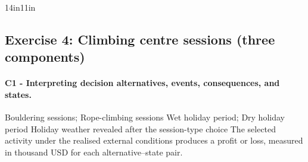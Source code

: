 \begin{CalculationLandscape}{14in}{11in}
	\begingroup\renewcommand{\CalculationStateCount}{2}
\endgroup
\end{CalculationLandscape}


	\newpage
	\subsection{Exercise 4: Climbing centre sessions (three components)}
	\label{sec:problem4-climbing-centre-c1-c3}
	\paragraph*{C1 - Interpreting decision alternatives, events, consequences, and states.}
	\DecisionElementsTable
{Bouldering sessions; Rope-climbing sessions}
{Wet holiday period; Dry holiday period}
{Holiday weather revealed after the session-type choice}
{The selected activity under the realised external conditions produces a profit or loss, measured in thousand USD for each alternative--state pair.}

